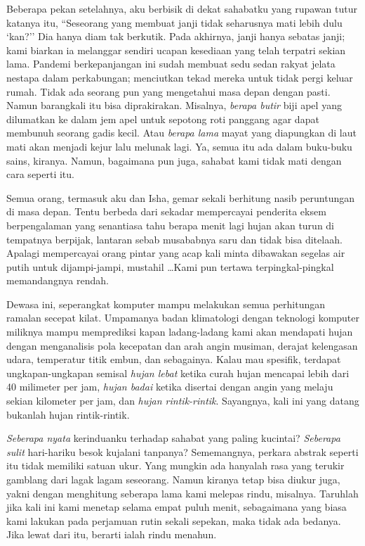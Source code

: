 \documentclass[smalldemyvopaper,11pt,twoside,onecolumn,openright,extrafontsizes]{memoir}
\begin{document}

Beberapa pekan setelahnya, aku berbisik di dekat sahabatku yang rupawan tutur katanya itu, ``Seseorang yang membuat janji tidak seharusnya mati lebih dulu `kan?'' Dia hanya diam tak berkutik. Pada akhirnya, janji hanya sebatas janji; kami biarkan ia melanggar sendiri ucapan kesediaan yang telah terpatri sekian lama. Pandemi berkepanjangan ini sudah membuat sedu sedan rakyat jelata nestapa dalam perkabungan; menciutkan tekad mereka untuk tidak pergi keluar rumah. Tidak ada seorang pun yang mengetahui masa depan dengan pasti. Namun barangkali itu bisa diprakirakan. Misalnya, \textit{berapa butir} biji apel yang dilumatkan ke dalam jem apel untuk sepotong roti panggang agar dapat membunuh seorang gadis kecil. Atau \textit{berapa lama} mayat yang diapungkan di laut mati akan menjadi kejur lalu melunak lagi. Ya, semua itu ada dalam buku-buku sains, kiranya. Namun, bagaimana pun juga, sahabat kami tidak mati dengan cara seperti itu.


Semua orang, termasuk aku dan Isha, gemar sekali berhitung nasib peruntungan di masa depan. Tentu berbeda dari sekadar mempercayai penderita eksem berpengalaman yang senantiasa tahu berapa menit lagi hujan akan turun di tempatnya berpijak, lantaran sebab musababnya saru dan tidak bisa ditelaah. Apalagi mempercayai orang pintar yang acap kali minta dibawakan segelas air putih untuk dijampi-jampi, mustahil \dots Kami pun tertawa terpingkal-pingkal memandangnya rendah.


Dewasa ini, seperangkat komputer mampu melakukan semua perhitungan ramalan secepat kilat. Umpamanya badan klimatologi dengan teknologi komputer miliknya mampu memprediksi kapan ladang-ladang kami akan mendapati hujan dengan menganalisis pola kecepatan dan arah angin musiman, derajat kelengasan udara, temperatur titik embun, dan sebagainya. Kalau mau spesifik, terdapat ungkapan-ungkapan semisal \textit{hujan lebat} ketika curah hujan mencapai lebih dari 40 milimeter per jam, \textit{hujan badai} ketika disertai dengan angin yang melaju sekian kilometer per jam, dan \textit{hujan rintik-rintik}. Sayangnya, kali ini yang datang bukanlah hujan rintik-rintik.


\textit{Seberapa nyata} kerinduanku terhadap sahabat yang paling kucintai? \textit{Seberapa sulit} hari-hariku besok kujalani tanpanya? Sememangnya, perkara abstrak seperti itu tidak memiliki satuan ukur. Yang mungkin ada hanyalah rasa yang terukir gamblang dari lagak lagam seseorang. Namun kiranya tetap bisa diukur juga, yakni dengan menghitung seberapa lama kami melepas rindu, misalnya. Taruhlah jika kali ini kami menetap selama empat puluh menit, sebagaimana yang biasa kami lakukan pada perjamuan rutin sekali sepekan, maka tidak ada bedanya. Jika lewat dari itu, berarti ialah rindu menahun.
\end{document}
